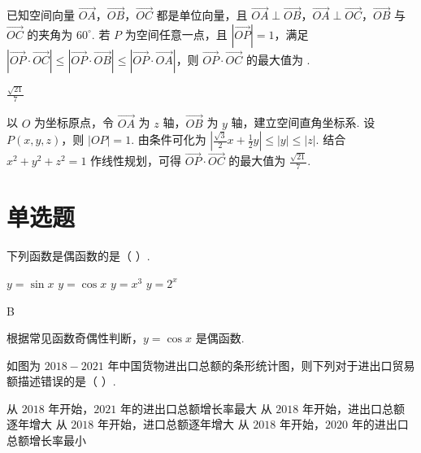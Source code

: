 \begin{problem}
已知空间向量 \(\overrightarrow{OA}\)，\(\overrightarrow{OB}\)，\(\overrightarrow{OC}\) 都是单位向量，且 \(\overrightarrow{OA}\perp \overrightarrow{OB}\)，\(\overrightarrow{OA}\perp \overrightarrow{OC}\)，\(\overrightarrow{OB}\) 与 \(\overrightarrow{OC}\) 的夹角为 \(60^\circ\). 若 \(P\) 为空间任意一点，且 \(\left|\overrightarrow{OP}\right|=1\)，满足 \(\left|\overrightarrow{OP}\cdot\overrightarrow{OC}\right|\le \left|\overrightarrow{OP}\cdot\overrightarrow{OB}\right|\le \left|\overrightarrow{OP}\cdot\overrightarrow{OA}\right|\)，则 \(\overrightarrow{OP}\cdot\overrightarrow{OC}\) 的最大值为\fillinblank{} .
\end{problem}

\begin{answer}
\(\frac{\sqrt{21}}{7}\)
\end{answer}

\begin{solution}
以 \(O\) 为坐标原点，令 \(\overrightarrow{OA}\) 为 \(z\) 轴，\(\overrightarrow{OB}\) 为 \(y\) 轴，建立空间直角坐标系. 设 \(P\left(x,y,z\right)\)，则 \(\left|OP\right|=1\). 由条件可化为 \(\left|\frac{\sqrt3}{2}x+\frac12 y\right|\le \left|y\right|\le \left|z\right|\).
结合 \(x^2+y^2+z^2=1\) 作线性规划，可得 \(\overrightarrow{OP}\cdot\overrightarrow{OC}\) 的最大值为 \(\frac{\sqrt{21}}{7}\).
\end{solution}
\section{单选题}

\begin{problem}
下列函数是偶函数的是（ \quad ）.

\choices
    {\(y=\sin x\)}
    {\(y=\cos x\)}
    {\(y=x^3\)}
    {\(y=2^x\)}
\end{problem}

\begin{answer}
B
\end{answer}

\begin{solution}
根据常见函数奇偶性判断，\(y=\cos x\) 是偶函数.
\end{solution}

\begin{problem}
如图为 \(2018-2021\) 年中国货物进出口总额的条形统计图，则下列对于进出口贸易额描述错误的是（ \quad ）.


\choices
    {从 \(2018\) 年开始，\(2021\) 年的进出口总额增长率最大}
    {从 \(2018\) 年开始，进出口总额逐年增大}
    {从 \(2018\) 年开始，进口总额逐年增大}
    {从 \(2018\) 年开始，\(2020\) 年的进出口总额增长率最小}
\end{problem}

